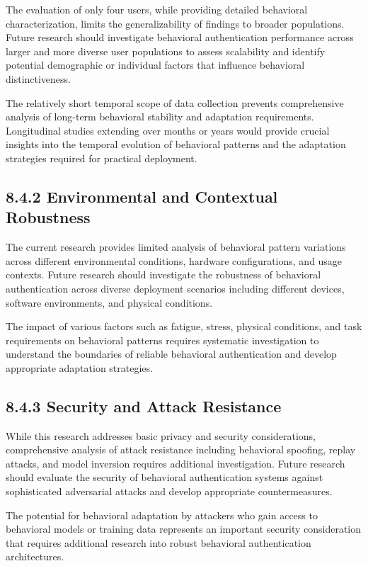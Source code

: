 \documentclass[
  12pt,
  a4paper,
]{report}
\begin{document}
The evaluation of only four users, while providing detailed behavioral
characterization, limits the generalizability of findings to broader
populations. Future research should investigate behavioral
authentication performance across larger and more diverse user
populations to assess scalability and identify potential demographic or
individual factors that influence behavioral distinctiveness.

The relatively short temporal scope of data collection prevents
comprehensive analysis of long-term behavioral stability and adaptation
requirements. Longitudinal studies extending over months or years would
provide crucial insights into the temporal evolution of behavioral
patterns and the adaptation strategies required for practical
deployment.

\subsection{8.4.2 Environmental and Contextual
Robustness}\label{environmental-and-contextual-robustness}

The current research provides limited analysis of behavioral pattern
variations across different environmental conditions, hardware
configurations, and usage contexts. Future research should investigate
the robustness of behavioral authentication across diverse deployment
scenarios including different devices, software environments, and
physical conditions.

The impact of various factors such as fatigue, stress, physical
conditions, and task requirements on behavioral patterns requires
systematic investigation to understand the boundaries of reliable
behavioral authentication and develop appropriate adaptation strategies.

\subsection{8.4.3 Security and Attack
Resistance}\label{security-and-attack-resistance}

While this research addresses basic privacy and security considerations,
comprehensive analysis of attack resistance including behavioral
spoofing, replay attacks, and model inversion requires additional
investigation. Future research should evaluate the security of
behavioral authentication systems against sophisticated adversarial
attacks and develop appropriate countermeasures.

The potential for behavioral adaptation by attackers who gain access to
behavioral models or training data represents an important security
consideration that requires additional research into robust behavioral
authentication architectures.
\end{document}
